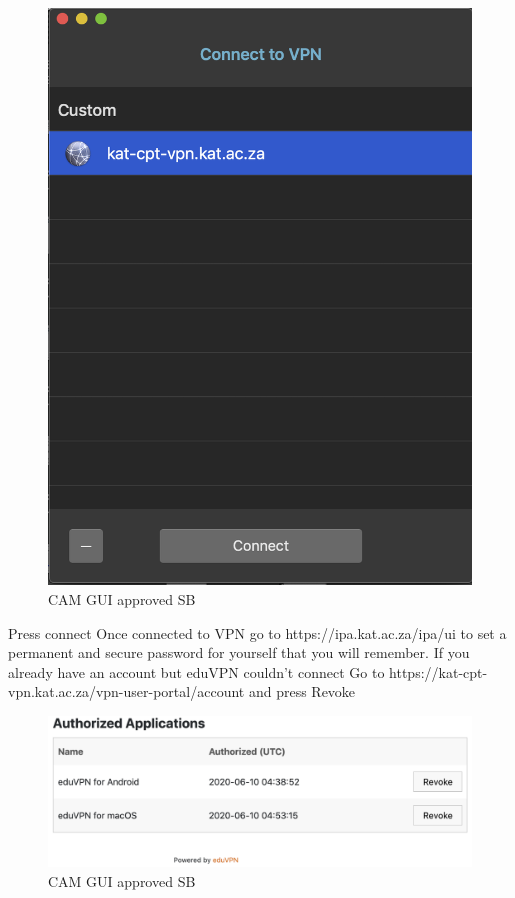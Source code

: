 \begin{figure}[!thb]
	\centering
	\includegraphics[scale=0.5]{Chapters/images/image63.png}
	
	\caption{CAM GUI approved SB }
	\label{fig:image63}
\end{figure}

Press connect
Once connected to VPN go to https://ipa.kat.ac.za/ipa/ui to set a permanent and secure password for yourself that you will remember.
If you already have an account but eduVPN couldn't connect
Go to https://kat-cpt-vpn.kat.ac.za/vpn-user-portal/account and press Revoke


\begin{figure}[!thb]
	\centering
	\includegraphics[scale=0.3]{Chapters/images/revoke2.png}
	
	\caption{CAM GUI approved SB }
	\label{fig:revoke}
\end{figure}







